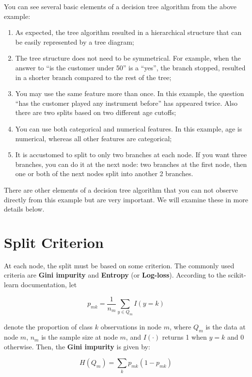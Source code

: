 \documentclass[
]{book}
\providecommand{\tightlist}{%
  \setlength{\itemsep}{0pt}\setlength{\parskip}{0pt}}
\theoremstyle{definition}
\theoremstyle{definition}
\theoremstyle{definition}
\theoremstyle{definition}
\theoremstyle{remark}
\begin{document}
You can see several basic elements of a decision tree algorithm from the above example:

\begin{enumerate}
\def\labelenumi{\arabic{enumi}.}
\tightlist
\item
  As expected, the tree algorithm resulted in a hierarchical structure that can be easily represented by a tree diagram;
\item
  The tree structure does not need to be symmetrical. For example, when the answer to ``is the customer under 50'' is a ``yes'', the branch stopped, resulted in a shorter branch compared to the rest of the tree;
\item
  You may use the same feature more than once. In this example, the question ``has the customer played any instrument before'' has appeared twice. Also there are two splits based on two different age cutoffs;
\item
  You can use both categorical and numerical features. In this example, age is numerical, whereas all other features are categorical;
\item
  It is accustomed to split to only two branches at each node. If you want three branches, you can do it at the next node: two branches at the first node, then one or both of the next nodes split into another 2 branches.
\end{enumerate}

There are other elements of a decision tree algorithm that you can not observe directly from this example but are very important. We will examine these in more details below.

\hypertarget{split-criterion}{%
\section{Split Criterion}\label{split-criterion}}

At each node, the split must be based on some criterion. The commonly used criteria are \textbf{Gini impurity} and \textbf{Entropy} (or \textbf{Log-loss}). According to the scikit-learn documentation, let

\[p_{mk}=\frac{1}{n_m}\sum_{y\in Q_m}{I(y=k)}\]

denote the proportion of class \(k\) observations in node \(m\), where \(Q_m\) is the data at node \(m\), \(n_m\) is the sample size at node \(m\), and \(I(\cdot)\) returns 1 when \(y=k\) and 0 otherwise. Then, the \textbf{Gini impurity} is given by:

\[H(Q_m)=\sum_{k}{p_{mk}(1-p_{mk})}\]
\end{document}
